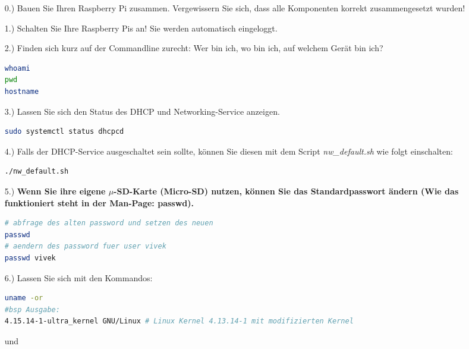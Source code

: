 \documentclass[paper=a4,fontsize=11pt]{scrartcl}%
\numberwithin{equation}{section}
\begin{document}
\begin{itemize}
	\item[0.)] Bauen Sie Ihren Raspberry Pi zusammen. Vergewissern Sie sich, dass alle Komponenten korrekt zusammengesetzt wurden!
	\item[1.)] Schalten Sie Ihre Raspberry Pis an! Sie werden automatisch eingeloggt.
	\item[2.)] Finden sich kurz auf der Commandline zurecht: \glqq Wer bin ich, wo bin ich, auf welchem Gerät bin ich?\grqq
		\begin{lstlisting}[style=Bash, language=Bash]
whoami
pwd
hostname
		\end{lstlisting}	
	\item[3.)] Lassen Sie sich den Status des DHCP und Networking-Service anzeigen.
	\begin{lstlisting}[style=Bash, language=Bash]
sudo systemctl status dhcpcd
		\end{lstlisting}
	\item[4.)] Falls der DHCP-Service ausgeschaltet sein sollte, können Sie diesen mit dem Script \emph{nw\_default.sh} wie folgt einschalten:
	\begin{lstlisting}[style=Bash, language=Bash]
./nw_default.sh
		\end{lstlisting}	
	\item[5.)] \textbf{Wenn Sie ihre eigene $\mu$-SD-Karte (Micro-SD) nutzen, können Sie das Standardpasswort ändern (Wie das funktioniert steht in der Man-Page: passwd).}
		\begin{lstlisting}[style=Bash, language=Bash]
# abfrage des alten password und setzen des neuen
passwd
# aendern des password fuer user vivek
passwd vivek
		\end{lstlisting}	
	\item[6.)] Lassen Sie sich mit den Kommandos:
\begin{lstlisting}[style=Bash, language=Bash]
uname -or
#bsp Ausgabe:
4.15.14-1-ultra_kernel GNU/Linux # Linux Kernel 4.13.14-1 mit modifizierten Kernel
\end{lstlisting} und
		

\end{itemize}
\end{document}
